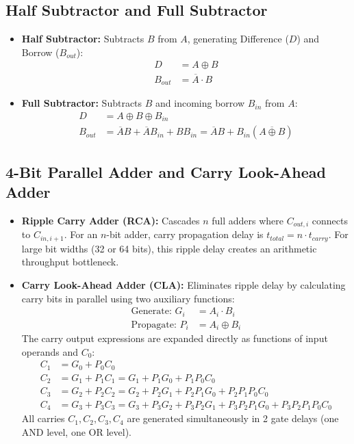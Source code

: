 \subsection{Half Subtractor and Full Subtractor}
\begin{itemize}
    \item \textbf{Half Subtractor:} Subtracts $B$ from $A$, generating Difference ($D$) and Borrow ($B_{out}$):
    \begin{align}
    D &= A \oplus B \\
    B_{out} &= \overline{A} \cdot B
    \end{align}
    \item \textbf{Full Subtractor:} Subtracts $B$ and incoming borrow $B_{in}$ from $A$:
    \begin{align}
    D &= A \oplus B \oplus B_{in} \\
    B_{out} &= \overline{A}B + \overline{A}B_{in} + B B_{in} = \overline{A}B + B_{in}(\overline{A \oplus B})
    \end{align}
\end{itemize}

\subsection{4-Bit Parallel Adder and Carry Look-Ahead Adder}
\begin{itemize}
    \item \textbf{Ripple Carry Adder (RCA):} Cascades $n$ full adders where $C_{out, i}$ connects to $C_{in, i+1}$. For an $n$-bit adder, carry propagation delay is $t_{total} = n \cdot t_{carry}$. For large bit widths (32 or 64 bits), this ripple delay creates an arithmetic throughput bottleneck.
    \item \textbf{Carry Look-Ahead Adder (CLA):} Eliminates ripple delay by calculating carry bits in parallel using two auxiliary functions:
    \begin{align}
    \text{Generate: } G_i &= A_i \cdot B_i \\
    \text{Propagate: } P_i &= A_i \oplus B_i
    \end{align}
    The carry output expressions are expanded directly as functions of input operands and $C_0$:
    \begin{align}
    C_1 &= G_0 + P_0 C_0 \\
    C_2 &= G_1 + P_1 C_1 = G_1 + P_1 G_0 + P_1 P_0 C_0 \\
    C_3 &= G_2 + P_2 C_2 = G_2 + P_2 G_1 + P_2 P_1 G_0 + P_2 P_1 P_0 C_0 \\
    C_4 &= G_3 + P_3 C_3 = G_3 + P_3 G_2 + P_3 P_2 G_1 + P_3 P_2 P_1 G_0 + P_3 P_2 P_1 P_0 C_0
    \end{align}
    All carries $C_1, C_2, C_3, C_4$ are generated simultaneously in 2 gate delays (one AND level, one OR level).
\end{itemize}

